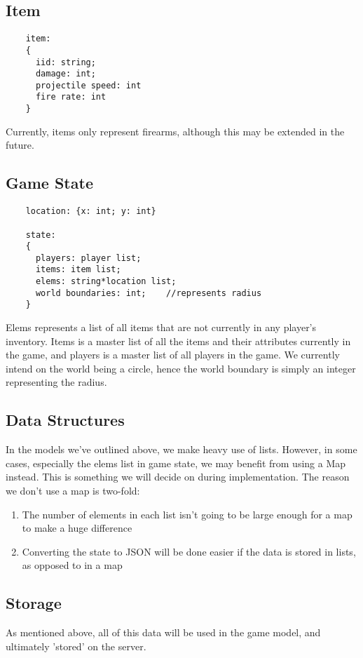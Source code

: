 \documentclass{article}
\begin{document}
	\subsection{Item}
	\begin{verbatim}
	item:
	{
	  iid: string;
	  damage: int;
	  projectile speed: int
	  fire rate: int
	}
	\end{verbatim}
	Currently, items only represent firearms, although this may be extended in the future.

	\subsection{Game State}
	\begin{verbatim}
	location: {x: int; y: int}

	state:
	{
	  players: player list;
	  items: item list;
	  elems: string*location list;
	  world boundaries: int;	//represents radius
	}
	\end{verbatim}
	Elems represents a list of all items that are not currently in any player's inventory. Items is a master list of all the items and their attributes currently in the game, and players is a master list of all players in the game. We currently intend on the world being a circle, hence the world boundary is simply an integer representing the radius.

    \subsection{Data Structures}
    In the models we've outlined above, we make heavy use of lists. However, in some cases, especially the elems list in game state, we may benefit from using a Map instead. This is something we will decide on during implementation. The reason we don't use a map is two-fold:
    \begin{enumerate}
    	\item The number of elements in each list isn't going to be large enough for a map to make a huge difference
	\item Converting the state to JSON will be done easier if the data is stored in lists, as opposed to in a map
    \end{enumerate}

    \subsection{Storage}
    As mentioned above, all of this data will be used in the game model, and ultimately 'stored' on the server.
\end{document}
